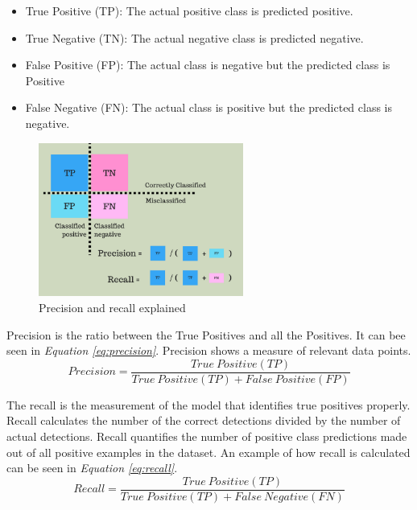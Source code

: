 \begin{itemize}
  \item True Positive (TP): The actual positive class is predicted positive.
  \item True Negative (TN): The actual negative class is predicted negative.
  \item False Positive (FP): The actual class is negative but the predicted class is Positive
  \item False Negative (FN): The actual class is positive but the predicted class is negative.
\end{itemize}

\begin{figure}[h]
  \centering
  \includegraphics[width=0.6\textwidth]{graphics/Precisionrecall.png}
  \caption{Precision and recall explained \cite{mittapally_whats_2019}}
  \label{fig:precisionrecall}
\end{figure}



Precision is the ratio between the True Positives and all the Positives. 
It can bee seen in \textit{Equation \ref{eq:precision}}. Precision shows a measure of relevant data points\cite{shung_accuracy_2018}.
\begin{equation}
  Precision = \frac{True\ Positive(TP)}{True\ Positive(TP)+False \ Positive(FP)}
  \label{eq:precision}
\end{equation}


The recall is the measurement of the model that identifies true positives properly. Recall calculates the number of the correct detections divided by the number of actual detections\cite{shung_accuracy_2018}. Recall quantifies the number of positive class predictions made out of all positive examples in the dataset. An example of how recall is calculated can be seen in \textit{Equation \ref{eq:recall}}.
\begin{equation}
  Recall = \frac{True\ Positive(TP)}{True\ Positive(TP)+False \ Negative(FN)}
  \label{eq:recall}
\end{equation}

